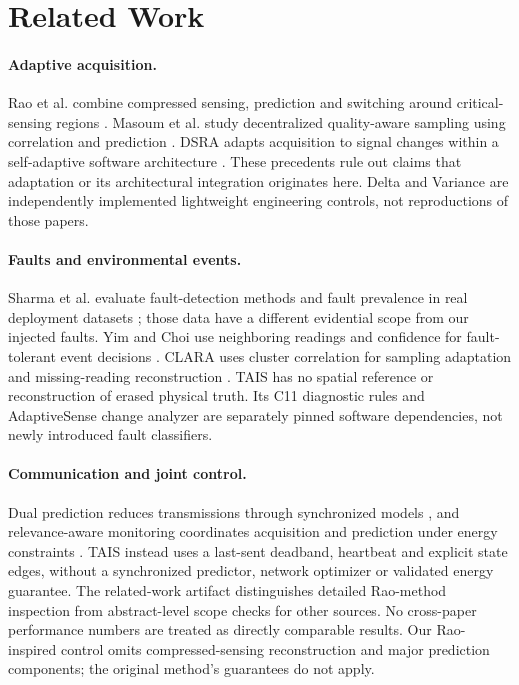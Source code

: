 \documentclass[10pt]{article}
\begin{document}
\section{Related Work}
\paragraph{Adaptive acquisition.}
Rao et al. combine compressed sensing, prediction and switching around critical-sensing regions \citep{rao2019adaptive}. Masoum et al. study decentralized quality-aware sampling using correlation and prediction \citep{masoum2012quality}. DSRA adapts acquisition to signal changes within a self-adaptive software architecture \citep{algabroun2020dsra}. These precedents rule out claims that adaptation or its architectural integration originates here. Delta and Variance are independently implemented lightweight engineering controls, not reproductions of those papers.

\paragraph{Faults and environmental events.}
Sharma et al. evaluate fault-detection methods and fault prevalence in real deployment datasets \citep{sharma2010faults}; those data have a different evidential scope from our injected faults. Yim and Choi use neighboring readings and confidence for fault-tolerant event decisions \citep{yim2010fault}. CLARA uses cluster correlation for sampling adaptation and missing-reading reconstruction \citep{harb2024clara}. TAIS has no spatial reference or reconstruction of erased physical truth. Its C11 diagnostic rules and AdaptiveSense change analyzer are separately pinned software dependencies, not newly introduced fault classifiers.

\paragraph{Communication and joint control.}
Dual prediction reduces transmissions through synchronized models \citep{dias2017dual}, and relevance-aware monitoring coordinates acquisition and prediction under energy constraints \citep{arnaiz2024energy}. TAIS instead uses a last-sent deadband, heartbeat and explicit state edges, without a synchronized predictor, network optimizer or validated energy guarantee. The related-work artifact distinguishes detailed Rao-method inspection from abstract-level scope checks for other sources. No cross-paper performance numbers are treated as directly comparable results. Our Rao-inspired control omits compressed-sensing reconstruction and major prediction components; the original method's guarantees do not apply.
\end{document}
